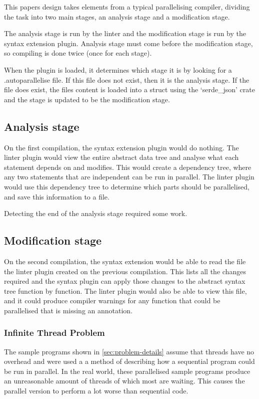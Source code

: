 \documentclass[conference]{IEEEtran}
\begin{document}
This papers design takes elements from a typical parallelising compiler, dividing the task into two main stages, an analysis stage and a modification stage.


The analysis stage is run by the linter and the modification stage is run by the syntax extension plugin. Analysis stage must come before the modification stage, so compiling is done twice (once for each stage).

When the plugin is loaded, it determines which stage it is by looking for a .autoparallelise file. If this file does not exist, then it is the analysis stage. If the file does exist, the files content is loaded into a struct using the `serde\_json' crate and the stage is updated to be the modification stage.

\subsection{Analysis stage}
On the first compilation, the syntax extension plugin would do nothing. The linter plugin would view the entire abstract data tree and analyse what each statement depends on and modifies. This would create a dependency tree, where any two statements that are independent can be run in parallel. The linter plugin would use this dependency tree to determine which parts should be parallelised, and save this information to a file.

Detecting the end of the analysis stage required some work.

\subsection{Modification stage}
On the second compilation, the syntax extension would be able to read the file the linter plugin created on the previous compilation. This lists all the changes required and the syntax plugin can apply those changes to the abstract syntax tree function by function. The linter plugin would also be able to view this file, and it could produce compiler warnings for any function that could be parallelised that is missing an annotation.

\subsubsection{Infinite Thread Problem}
The sample programs shown in \autoref{sec:problem-details} assume that threads have no overhead and were used a a method of describing how a sequential program could be run in parallel. In the real world, these parallelised sample programs produce an unreasonable amount of threads of which most are waiting. This causes the parallel version to perform a lot worse than sequential code.
\end{document}
